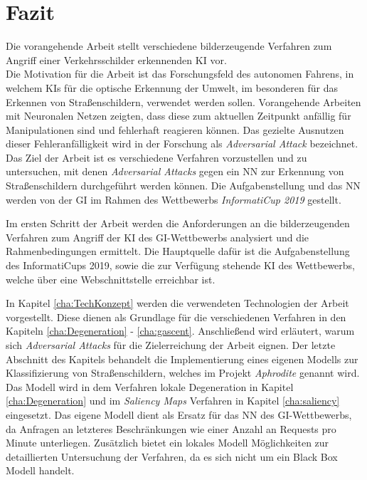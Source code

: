 \chapter{Fazit}
\label{cha:Fazit} \label{cha:Schluss}
Die vorangehende Arbeit stellt verschiedene bilderzeugende Verfahren zum Angriff einer Verkehrsschilder erkennenden \ac{KI} vor.\\
Die Motivation für die Arbeit ist das Forschungsfeld des autonomen Fahrens, in welchem \acp{KI} für die optische Erkennung der Umwelt, im besonderen für das Erkennen von Straßenschildern, verwendet werden sollen. Vorangehende Arbeiten mit Neuronalen Netzen zeigten, dass diese zum aktuellen Zeitpunkt anfällig für Manipulationen sind und fehlerhaft reagieren können. Das gezielte Ausnutzen dieser Fehleranfälligkeit wird in der Forschung als \textit{Adversarial Attack} bezeichnet. Das Ziel der Arbeit ist es verschiedene Verfahren vorzustellen und zu untersuchen, mit denen \textit{Adversarial Attacks} gegen ein \ac{NN} zur Erkennung von Straßenschildern durchgeführt werden können. Die Aufgabenstellung und das \ac{NN} werden von der \acl{GI} im Rahmen des Wettbewerbs \textit{InformatiCup 2019} gestellt.

Im ersten Schritt der Arbeit werden die Anforderungen an die bilderzeugenden Verfahren zum Angriff der \ac{KI} des \ac{GI}-Wettbewerbs analysiert und die Rahmenbedingungen ermittelt. Die Hauptquelle dafür ist die Aufgabenstellung des InformatiCups 2019, sowie die zur Verfügung stehende \ac{KI} des Wettbewerbs, welche über eine Webschnittstelle erreichbar ist.

In Kapitel \ref{cha:TechKonzept} werden die verwendeten Technologien der Arbeit vorgestellt. Diese dienen als Grundlage für die verschiedenen Verfahren in den Kapiteln \ref{cha:Degeneration} - \ref{cha:gascent}. Anschließend wird erläutert, warum sich \textit{Adversarial Attacks} für die Zielerreichung der Arbeit eignen. Der letzte Abschnitt des Kapitels behandelt die Implementierung eines eigenen Modells zur Klassifizierung von Straßenschildern, welches im Projekt \textit{Aphrodite} genannt wird. Das Modell wird in dem Verfahren lokale Degeneration in Kapitel \ref{cha:Degeneration} und im \textit{Saliency Maps} Verfahren in Kapitel \ref{cha:saliency} eingesetzt. Das eigene Modell dient als Ersatz für das \ac{NN} des \ac{GI}-Wettbewerbs, da Anfragen an letzteres Beschränkungen wie einer Anzahl an Requests pro Minute unterliegen. Zusätzlich bietet ein lokales Modell Möglichkeiten zur detaillierten Untersuchung der Verfahren, da es sich nicht um ein Black Box Modell handelt.
 
